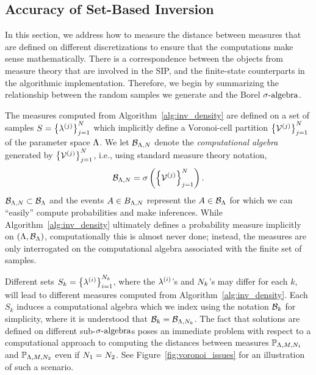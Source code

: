 \subsection{Accuracy of Set-Based Inversion}\label{sec:ch03-set}


In this section, we address how to measure the distance between measures that are defined on different discretizations to ensure that the computations make sense mathematically.
There is a correspondence between the objects from measure theory that are involved in the SIP, and the finite-state counterparts in the algorithmic implementation.
Therefore, we begin by summarizing the relationship between the random samples we generate and the Borel $\sigma\text{-algebra}$.

The measures computed from Algorithm~\ref{alg:inv_density} are defined on a set of samples $S = \left\{\lambda^{(j)}\right\}_{j=1}^{N}$ which implicitly define a Voronoi-cell partition $\left\{\mathcal{V}^{(j)}\right\}_{j=1}^{N}$ of the parameter space ${\Lambda}$.
We let $\mathcal{B}_{{\Lambda}, N}$ denote the \emph{computational algebra} generated by $\left\{\mathcal{V}^{(j)}\right\}_{j=1}^{N}$, i.e., using standard measure theory notation,
$$
	\mathcal{B}_{{\Lambda},N} = \sigma\left(\left\{\mathcal{V}^{(j)}\right\}_{j=1}^{N}\right).
$$
$\mathcal{B}_{{\Lambda}, N}\subset \mathcal{B}_{\Lambda}$ and the events $A\in B_{{\Lambda}, N}$ represent the $A\in\mathcal{B}_{\Lambda}$ for which we can ``easily'' compute probabilities and make inferences.
While Algorithm~\ref{alg:inv_density} ultimately defines a probability measure implicitly on $({\Lambda},\mathcal{B}_{\Lambda})$, computationally this is almost never done; instead, the measures are only interrogated on the computational algebra associated with the finite set of samples.

Different sets $S_k = \left\{\lambda^{(i)}\right\}_{i=1}^{N_k}$, where the $\lambda^{(i)}$'s and $N_k$'s may differ for each $k$, will lead to different measures computed from Algorithm~\ref{alg:inv_density}.
Each $S_k$ induces a computational algebra which we index using the notation $\mathcal{B}_{k}$ for simplicity, where it is understood that $\mathcal{B}_k = \mathcal{B}_{{\Lambda}, N_k}$.
The fact that solutions are defined on different sub-$\sigma\text{-algebra}$s poses an immediate problem with respect to a computational approach to computing the distances between measures $\mathbb{P}_{{\Lambda}, M, N_1}$ and $\mathbb{P}_{{\Lambda}, M, N_2}$ even if $N_1=N_2$.
See Figure~\ref{fig:voronoi_issues} for an illustration of such a scenario.

